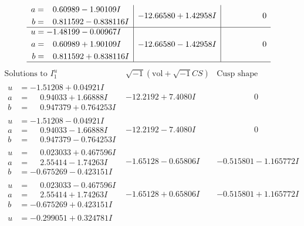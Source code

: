 \documentclass[1p]{elsarticle_modified}
\theoremstyle{definition}
\newcommand{\I}{\sqrt{-1}}
\begin{document}
$$\begin{array}{c|c|c}
\begin{aligned}
a &= \phantom{-}0.60989 - 1.90109 I \\
b &= \phantom{-}0.811592 - 0.838116 I\end{aligned}
 & -12.66580 + 1.42958 I & \phantom{-0.000000 } 0 \\ \hline\begin{aligned}
u &= -1.48199 - 0.00967 I \\
a &= \phantom{-}0.60989 + 1.90109 I \\
b &= \phantom{-}0.811592 + 0.838116 I\end{aligned}
 & -12.66580 - 1.42958 I & \phantom{-0.000000 } 0\\
 \hline 
 \end{array}$$\newpage$$\begin{array}{c|c|c}  
\text{Solutions to }I^u_{1}& \I (\text{vol} + \sqrt{-1}CS) & \text{Cusp shape}\\
 \hline 
\begin{aligned}
u &= -1.51208 + 0.04921 I \\
a &= \phantom{-}0.94033 + 1.66888 I \\
b &= \phantom{-}0.947379 + 0.764253 I\end{aligned}
 & -12.2192 + 7.4080 I & \phantom{-0.000000 } 0 \\ \hline\begin{aligned}
u &= -1.51208 - 0.04921 I \\
a &= \phantom{-}0.94033 - 1.66888 I \\
b &= \phantom{-}0.947379 - 0.764253 I\end{aligned}
 & -12.2192 - 7.4080 I & \phantom{-0.000000 } 0 \\ \hline\begin{aligned}
u &= \phantom{-}0.023033 + 0.467596 I \\
a &= \phantom{-}2.55414 - 1.74263 I \\
b &= -0.675269 - 0.423151 I\end{aligned}
 & -1.65128 - 0.65806 I & -0.515801 - 1.165772 I \\ \hline\begin{aligned}
u &= \phantom{-}0.023033 - 0.467596 I \\
a &= \phantom{-}2.55414 + 1.74263 I \\
b &= -0.675269 + 0.423151 I\end{aligned}
 & -1.65128 + 0.65806 I & -0.515801 + 1.165772 I \\ \hline\begin{aligned}
u &= -0.299051 + 0.324781 I \\

\end{aligned}
\end{array}$$
\end{document}
